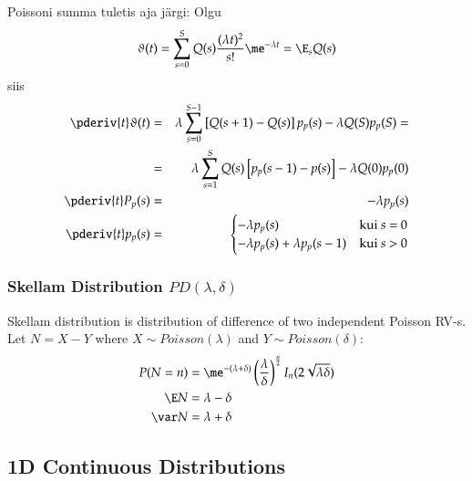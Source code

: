 \documentclass[a4paper]{article}
\numberwithin{equation}{subsection}
\begin{document}
Poissoni summa tuletis aja järgi: Olgu
\begin{equation}
  \vartheta(t) =
  \sum_{s=0}^S Q(s) \frac{(\lambda t)^2}{s!} \me^{-\lambda t} = 
  \E_s Q(s)
\end{equation}
siis
\begin{eqnarray}
  \pderiv{t} \vartheta(t) &=&
  \lambda \sum_{s=0}^{S - 1}
  \left[ Q(s + 1) - Q(s) \right] p_p(s) -
  \lambda Q(S) p_p(S) =\\
  &=&
  \lambda \sum_{s=1}^S Q(s) 
  \left[ p_p(s - 1) - p(s) \right]
  - \lambda Q(0) p_p(0)\\
  \pderiv{t} P_p(s) &=& -\lambda p_p(s)\\
  \pderiv{t} p_p(s) &=&
  \begin{cases}
    -\lambda p_p(s) & \text{kui $s$ = 0}\\
    -\lambda p_p(s) + \lambda p_p(s-1) & \text{kui $s$ > 0}\\
  \end{cases}
\end{eqnarray}


\subsubsection{Skellam Distribution $PD(\lambda,\delta)$}
\label{sec:skellam_distribution}

Skellam distribution is distribution of difference of two independent
Poisson RV-s.  Let $N = X - Y$ where $X \sim Poisson(\lambda)$ and $Y
\sim Poisson(\delta)$:
\begin{align}
  P(N=n) &= 
  \me^{-(\lambda + \delta)}
  \left(\frac{\lambda}{\delta} \right)^{\frac{n}{2}}
  I_{n}(2\sqrt{\lambda\delta})
  \\
  \E N &= \lambda - \delta
  \\
  \var N &= \lambda + \delta
\end{align}



\newpage
\subsection{1D Continuous Distributions}
\end{document}
